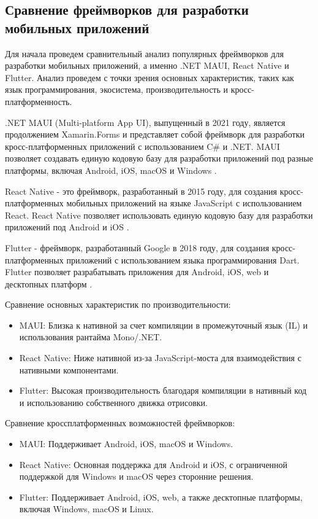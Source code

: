 
\subsection{Сравнение фреймворков для разработки мобильных приложений}
Для начала проведем сравнительный анализ популярных фреймворков для разработки мобильных приложений, а именно .NET MAUI, React Native и Flutter. Анализ проведем с точки зрения основных характеристик, таких как язык программирования, экосистема, производительность и кросс-платформенность. 

.NET MAUI (Multi-platform App UI), выпущенный в 2021 году, является продолжением Xamarin.Forms и представляет собой фреймворк для разработки кросс-платформенных приложений с использованием C\# и .NET. MAUI позволяет создавать единую кодовую базу для разработки приложений под разные платформы, включая Android, iOS, macOS и Windows \cite{MAUI}. 

React Native - это фреймворк, разработанный в 2015 году, для создания кросс-платформенных мобильных приложений на языке JavaScript с использованием React. React Native позволяет использовать единую кодовую базу для разработки приложений под Android и iOS \cite{React}. 

Flutter - фреймворк, разработанный Google в 2018 году, для создания кросс-платформенных приложений с использованием языка программирования Dart. Flutter позволяет разрабатывать приложения для Android, iOS, web и десктопных платформ \cite{Flutter}. 

Сравнение основных характеристик по производительности:
\begin{itemize}
        \item MAUI: Близка к нативной за счет компиляции в промежуточный язык (IL) и использования рантайма Mono/.NET.
        \item React Native: Ниже нативной из-за JavaScript-моста для взаимодействия с нативными компонентами.
        \item Flutter: Высокая производительность благодаря компиляции в нативный код и использованию собственного движка отрисовки.
\end{itemize}

Сравнение кроссплатформенных возможностей фреймворков:
\begin{itemize}
        \item MAUI: Поддерживает Android, iOS, macOS и Windows.
        \item React Native: Основная поддержка для Android и iOS, с ограниченной поддержкой для Windows и macOS через сторонние решения.
        \item Flutter: Поддерживает Android, iOS, web, а также десктопные платформы, включая Windows, macOS и Linux.
\end{itemize}

